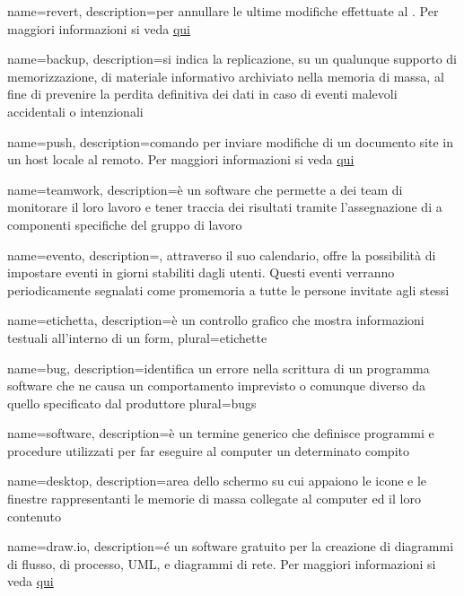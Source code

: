  {
	name=revert,
	description={per annullare le ultime modifiche effettuate al . Per maggiori informazioni si veda \href{https://git-scm.com/docs/}{qui}}
}

 {
	name=backup,
	description={si indica la replicazione, su un qualunque supporto di memorizzazione, di materiale informativo archiviato nella memoria di massa, al fine di prevenire la perdita definitiva dei dati in caso di eventi malevoli accidentali o intenzionali}
}

 {
	name=push,
	description={comando  per inviare modifiche di un documento site in un host locale al  remoto. Per maggiori informazioni si veda \href{https://git-scm.com/docs/}{qui}}
}

 {
	name=teamwork,
	description={è un software che permette a dei team di monitorare il loro lavoro e tener traccia dei risultati tramite l'assegnazione di  a componenti specifiche del gruppo di lavoro}
}

 {
	name=evento,
	description={, attraverso il suo calendario, offre la possibilità di impostare eventi in giorni stabiliti dagli utenti. Questi eventi verranno periodicamente segnalati come promemoria a tutte le persone invitate agli stessi}
}

 {
	name=etichetta,
	description={è un controllo grafico che mostra informazioni testuali all'interno di un form},
	plural=etichette
}

 {
	name=bug,
	description={identifica un errore nella scrittura di un programma software che ne causa un comportamento imprevisto o comunque diverso da quello specificato dal produttore}
	plural=bugs
}

 {
	name=software,
	description={è un termine generico che definisce programmi e procedure utilizzati per far eseguire al computer un determinato compito}
}

 {
	name=desktop,
	description={area dello schermo su cui appaiono le icone e le finestre rappresentanti le memorie di massa collegate al computer ed il loro contenuto}
}

 {
	name=draw.io,
	description={é un software gratuito per la creazione di diagrammi di flusso, di processo, UML, e diagrammi di rete. Per maggiori informazioni si veda \href{https://www.draw.io}{qui}}
}

